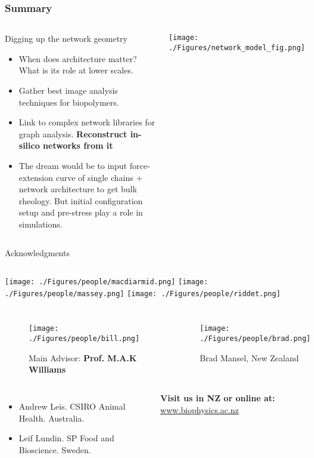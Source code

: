 \documentclass[10pt]{beamer}
\begin{document}
\begin{frame}
  \frametitle{Summary}
  \begin{columns}[onlytextwidth]
      \begin{alertblock}{Digging up the network geometry}
          \begin{itemize}
              \item When does architecture matter? What is its role at lower scales.
              \item Gather best image analysis techniques for biopolymers.
              \item Link to complex network libraries for graph analysis. \textbf{Reconstruct in-silico networks from it}
              \item \alert{The dream} would be to input force-extension curve of single chains +  network architecture to get bulk rheology. But initial configuration setup and pre-stress play a role in simulations.
          \end{itemize}
      \end{alertblock}
        \centering\texttt{[image: ./Figures/network\_model\_fig.png]}
  \end{columns}
\end{frame}
\begin{frame}{Acknowledgments}

  \vspace{0.3cm}
  \begin{columns}[onlytextwidth]
    \texttt{[image: ./Figures/people/macdiarmid.png]}
    \texttt{[image: ./Figures/people/massey.png]}
    \texttt{[image: ./Figures/people/riddet.png]}
  \end{columns}
  \begin{columns}[onlytextwidth]
\begin{figure}[htpb]
  \centering
  \texttt{[image: ./Figures/people/bill.png]}
  \caption*{Main Advisor: \textbf{Prof. M.A.K Williams}}
\end{figure}
    \begin{figure}[htpb]
      \centering
      \texttt{[image: ./Figures/people/brad.png]}
      \caption*{Brad Mansel, New Zealand}
    \end{figure}
  \end{columns}
  \begin{columns}[onlytextwidth]
    \begin{itemize}
      \item Andrew Leis. CSIRO Animal Health. Australia.
      \item Leif Lundin. SP Food and Bioscience. Sweden.
    \end{itemize}
    \textbf{Visit us in NZ or online at:}\newline
        \url{www.biophysics.ac.nz}
  \end{columns}
\end{frame}
\end{document}
